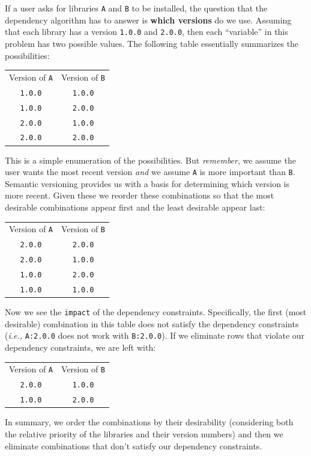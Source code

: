 \documentclass[11pt,a4paper,twocolumn]{article}
\renewcommand{\small}{\fontsize{9.5pt}{11.1pt}\selectfont}
\newcommand{\code}[1]{\texttt{#1}} %
\begin{document}
If a user asks for libraries \code{A} and \code{B} to be installed,
the question that the dependency algorithm has to answer is \textbf{which
  versions} do we use.  Assuming that each library has a version
\code{1.0.0} and \code{2.0.0}, then each ``variable'' in this
problem has two possible values.  The following table essentially
summarizes the possibilities:
{\small
\begin{center}
\begin{tabular}{ c c }
  Version of \code{A} & Version of \code{B} \\
  \code{1.0.0} & \code{1.0.0} \\
  \code{1.0.0} & \code{2.0.0} \\
  \code{2.0.0} & \code{1.0.0} \\
  \code{2.0.0} & \code{2.0.0} \\
\end{tabular}
\end{center}
}
This is a simple enumeration of the possibilities.  But
\emph{remember}, we assume the user wants the most recent version
\emph{and} we assume \code{A} is more important than \code{B}.  Semantic
versioning provides us with a basis for determining which version is
more recent.  Given these we reorder these combinations so that the
most desirable combinations appear first and the least desirable
appear last:
{\small
\begin{center}
\begin{tabular}{ c c }
  Version of \code{A} & Version of \code{B} \\
  \code{2.0.0} & \code{2.0.0} \\
  \code{2.0.0} & \code{1.0.0} \\
  \code{1.0.0} & \code{2.0.0} \\
  \code{1.0.0} & \code{1.0.0} \\
\end{tabular}
\end{center}
}
Now we see the \code{impact} of the dependency constraints.  Specifically,
the first (most desirable) combination in this table does not satisfy
the dependency constraints (\emph{i.e.,} \code{A:2.0.0} does not work
with \code{B:2.0.0}).  If we eliminate rows that violate our
dependency constraints, we are left with:
{\small
\begin{center}
\begin{tabular}{ c c }
  Version of \code{A} & Version of \code{B} \\
  \code{2.0.0} & \code{1.0.0} \\
  \code{1.0.0} & \code{2.0.0} \\
\end{tabular}
\end{center}
}
In summary, we order the combinations by their desirability
(considering both the relative priority of the libraries and their
version numbers) and then we eliminate combinations that don't satisfy
our dependency constraints.
\end{document}
